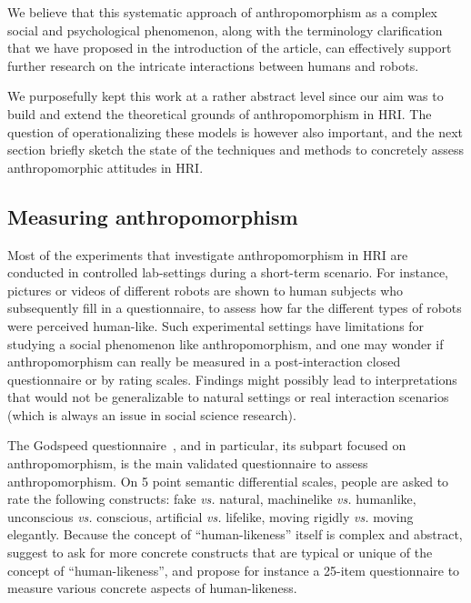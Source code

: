 \documentclass{frontiersSCNS} %
\newcommand{\vs}{\textit{vs.}\xspace}
\begin{document}
We believe that this systematic approach of anthropomorphism as a complex social
and psychological phenomenon, along with the terminology clarification that we
have proposed in the introduction of the article, can effectively support
further research on the intricate interactions between humans and robots.

We purposefully kept this work at a rather abstract level since our aim was to
build and extend the theoretical grounds of anthropomorphism in HRI. The
question of operationalizing these models is however also important, and the
next section briefly sketch the state of the techniques and methods to
concretely assess anthropomorphic attitudes in HRI.

\subsection{Measuring anthropomorphism}
\label{sec:measuring}

Most of the experiments that investigate anthropomorphism in HRI are conducted
in controlled lab-settings during a short-term scenario. For instance, pictures
or videos of different robots are shown to human subjects who subsequently fill
in a questionnaire, to assess how far the different types of robots were
perceived human-like. Such experimental settings have limitations for studying a
social phenomenon like anthropomorphism, and one may wonder if anthropomorphism
can really be measured in a post-interaction closed questionnaire or by rating
scales. Findings might possibly lead to interpretations that would not be
generalizable to natural settings or real interaction scenarios (which is always
an issue in social science research).

The Godspeed questionnaire~\citep{bartneck_measurement_2008}, and in particular,
its subpart focused on anthropomorphism, is the main validated questionnaire to
assess anthropomorphism. On 5 point semantic differential scales, people are
asked to rate the following constructs: fake \vs natural, machinelike \vs
humanlike, unconscious \vs conscious, artificial \vs lifelike, moving rigidly
\vs moving elegantly. Because the concept of ``human-likeness'' itself is
complex and abstract, \cite{kahn_jr._robotic_2006} suggest to ask for more
concrete constructs that are typical or unique of the concept of
``human-likeness'', and \cite{ruijten_introducing_2014} propose for instance a
25-item questionnaire to measure various concrete aspects of human-likeness.
\end{document}
